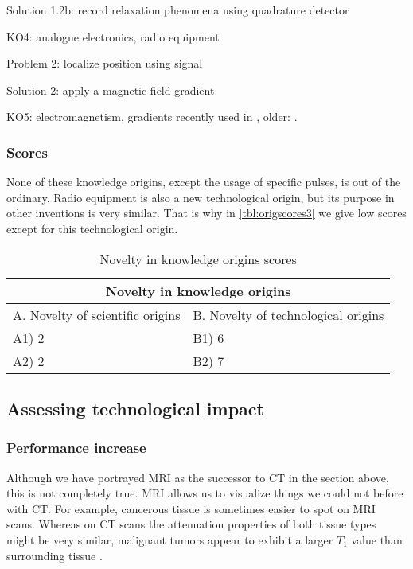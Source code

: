 Solution 1.2b: record relaxation phenomena using quadrature detector

KO4: analogue electronics, radio equipment 

Problem 2: localize position using signal

Solution 2: apply a magnetic field gradient

KO5: electromagnetism, gradients recently used in \cite{nanogradients1,
nanogradients2}, older: \cite{oldgradients}.

\subsubsection{Scores}
None of these knowledge origins, except the usage of specific pulses, is out of
the ordinary. Radio equipment is also a new technological origin, but its
purpose in other inventions is very similar. That is why in
\autoref{tbl:origscores3} we give low scores except for this technological
origin.

\begin{table}[h]
\centering
\begin{tabular}{l l}
\hline
\multicolumn{2}{|c|}{Novelty in knowledge origins} \\
\hline
A. Novelty of scientific origins & B. Novelty of technological origins\\
A1) 2 & B1) 6\\ 
A2) 2 & B2) 7\\ 
\hline
\end{tabular}
\caption{Novelty in knowledge origins scores}
\label{tbl:origscores3}
\end{table}

\subsection{Assessing technological impact}
\subsubsection{Performance increase}
Although we have portrayed MRI as the successor to CT in the section above, this
is not completely true. MRI allows us to visualize things we could not before
with CT. For example, cancerous tissue is sometimes easier to spot on MRI scans.
Whereas on CT scans the attenuation properties of both tissue types might be
very similar, malignant tumors appear to exhibit a larger $T_1$ value than
surrounding tissue \cite{mrihistory}.


